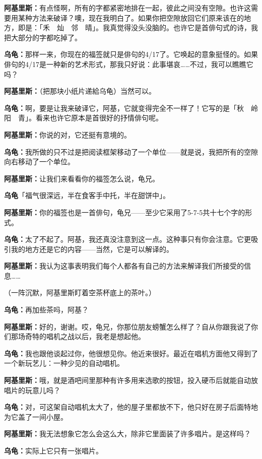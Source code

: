 \documentclass[
  12pt,
  twoside,
  openright,
  oldfontcommands,
]{memoir}
\newcommand{\kaitismall}[1]{{\kaitifamily\small #1}}
\newcommand{\dialogname}[1]{{\heifamily\bfseries #1}}
\begin{document}
\dialogname{阿基里斯：}有点怪啊，所有的字都紧密地排在一起，彼此之间没有空隙。也许这需要用某种方法来破译？噢，现在我明白了。如果你把空隙放回它们原来该在的地方，即是：「禾　灿　邻　晴」。我真觉得没头没脑的。也许它是首俳句式的诗，我把大部分的字都吃掉了。

\dialogname{乌龟：}那样一来，你现在的福签就只是俳句的4/17了。它唤起的意象挺怪的。如果俳句的4/17是一种新的艺术形式，那我只好说：此事堪哀\ldots\ldots 不过，我可以瞧瞧它吗？

\dialogname{阿基里斯：}\kaitismall{（把那块小纸片递給乌龟）}当然可以。

\dialogname{乌龟：}啊，要是让我来破译它，阿基，它就变得完全不一样了！它写的是「秋　岭　阳　青」。看来也许它原本是首很好的抒情俳句呢。

\dialogname{阿基里斯：}你说的对，它还挺有意境的。

\dialogname{乌龟：}我所做的只不过是把阅读框架移动了一个单位------就是说，我把所有的空隙向右移动了一个单位。

\dialogname{阿基里斯：}让我们来看看你的福签怎么说，龟兄。

\dialogname{乌龟}「福气很深远，半在食客手中托，半在甜饼中」。

\dialogname{阿基里斯：}你的福签也是一首俳句，龟兄------至少它采用了5-7-5共十七个字的形式。

\dialogname{乌龟：}太了不起了。阿基，我还真没注意到这一点。这种事只有你会注意。它更吸引我的地方还是它的内容------当然，它是可以解译的。

\dialogname{阿基里斯：}我认为这事表明我们每个人都各有自己的方法来解译我们所接受的信息\ldots\ldots{}

（一阵沉默，阿基里斯盯着空茶杯底上的茶叶。）

\dialogname{乌龟：}再加些茶吗，阿基？

\dialogname{阿基里斯：}好的，谢谢。哎，龟兄，你那位朋友螃蟹怎么样了？自从你跟我说了你们那场奇特的唱机之战以后，我老是想起他。

\dialogname{乌龟：}我也跟他谈起过你，他很想见你。他近来很好。最近在唱机方面他又得到了一个新玩艺儿：一种少见的自动唱机。

\dialogname{阿基里斯：}哦，就是酒吧间里那种有许多用来选歌的按钮，投入硬币后就能自动放唱片的玩意儿吗？

\dialogname{乌龟：}对，可这架自动唱机太大了，他的屋子里都放不下，他只好在房子后面特地为它盖了一间小屋。

\dialogname{阿基里斯：}我无法想象它怎么会这么大，除非它里面装了许多唱片。是这样吗？

\dialogname{乌龟：}实际上它只有一张唱片。
\end{document}
